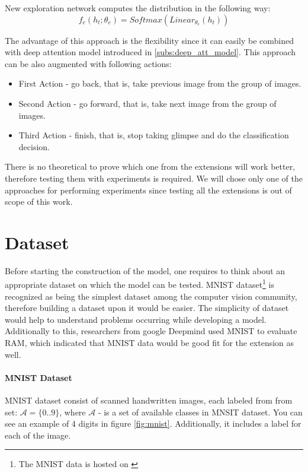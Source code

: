 New exploration network computes the distribution in the following way:
\begin{equation}
	f_e(h_t; \theta_e) = Softmax(Linear_{\theta_e}(h_t))
\end{equation}

The advantage of this approach is the flexibility since it can easily be combined
with deep attention model introduced in \autoref{subs:deep_att_model}. This
approach can be also augmented with following actions:
\begin{itemize}
	\item First Action - go back, that is, take previous image from the group of images.
	\item Second Action - go forward, that is, take next image from the group of images.
	\item Third Action - finish, that is, stop taking glimpse and do the classification decision.
\end{itemize}

There is no theoretical to prove which one from the extensions will work better,
therefore testing them with experiments is required.
We will chose only one of the approaches for
performing experiments since testing all the extensions
is out of scope of this work.

\section{Dataset}
\label{sec:analysis_dataset}

Before starting the construction of the model, one requires to think about an appropriate
dataset on which the model can be tested.
MNIST dataset\footnote{The MNIST data is hosted on \cite{LeCun2010}} is recognized
as being the simplest dataset among the computer vision
community, therefore building a dataset upon it would be easier. The simplicity of dataset
would help to understand problems occurring while developing a model.
Additionally to this, researchers from google
Deepmind used MNIST to evaluate RAM, which indicated that MNIST data would
be good fit for the extension as well. \cite{DBLP:journals/corr/MnihHGK14}


\paragraph{MNIST Dataset} MNIST dataset consist of scanned handwritten images, each labeled
from from set: $\mathcal{A} = \{0 .. 9\}$, where $\mathcal{A}$ - is a set of available
classes in MNSIT dataset. You can see an example of 4 digits in figure \ref{fig:mnist}.
Additionally, it includes a label for each of the image.

